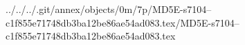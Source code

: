 ../../../.git/annex/objects/0m/7p/MD5E-s7104--c1f855e71748db3ba12be86ae54ad083.tex/MD5E-s7104--c1f855e71748db3ba12be86ae54ad083.tex